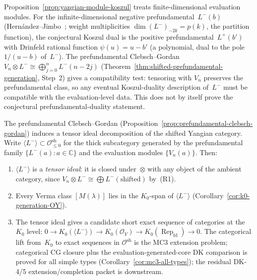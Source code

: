 \begin{remark}
\label{rem:prefundamental-koszul-extension}
Proposition~\ref{prop:yangian-module-koszul} treats finite-dimensional
evaluation modules. For the infinite-dimensional negative
prefundamental~$L^-(b)$
(Hern\'andez--Jimbo~\cite{HJZ25}; weight multiplicities
$\dim(L^-)_{-2k} = p(k)$, the partition function), the conjectural
Koszul dual is the positive prefundamental~$L^+(b')$ with Drinfeld
rational function $\psi(u) = u - b'$ (a polynomial, dual to the
pole~$1/(u - b)$ of~$L^-$). The prefundamental Clebsch--Gordan
$V_n \otimes L^- \cong \bigoplus_{j=0}^{n} L^-(n-2j)$
(Theorem~\ref{thm:shifted-prefundamental-generation},
Step~2) gives a compatibility test: tensoring with $V_n$
preserves the prefundamental class, so any eventual Koszul-duality
description of~$L^-$ must be compatible with the evaluation-level
data. This does not by itself prove the conjectural
prefundamental-duality statement.
\end{remark}

\begin{remark}%
\label{rem:tensor-ideal-structure}%
%
%
The prefundamental Clebsch--Gordan
(Proposition~\ref{prop:prefundamental-clebsch-gordan})
induces a tensor ideal decomposition of the shifted Yangian
category. Write
$\langle L^- \rangle \subset \mathcal{O}^{\mathrm{sh}}_{\leq 0}$
for the thick subcategory generated by the prefundamental family
$\{L^-(a) : a \in \mathbb{C}\}$ and the evaluation modules
$\{V_n(a)\}$. Then:
\begin{enumerate}[label=\textup{(\roman*)},nosep]
\item $\langle L^- \rangle$ is a \emph{tensor ideal}: it is closed
 under~$\otimes$ with any object of the ambient category, since
 $V_n \otimes L^- \cong \bigoplus L^-(\text{shifted})$
 by~(R1).
\item Every Verma class $[M(\lambda)]$ lies in the $K_0$-span
 of $\langle L^- \rangle$
 (Corollary~\ref{cor:k0-generation-OY}).
\item The tensor ideal gives a candidate short exact sequence of
 categories at the $K_0$ level:
 $0 \to K_0(\langle L^- \rangle)
 \to K_0(\mathcal{O}_Y)
 \to K_0(\operatorname{Rep}_{\mathrm{fd}}) \to 0$.
 The categorical lift from~$K_0$ to exact sequences in
 $\mathcal{O}^{\mathrm{sh}}$ is the MC3 extension problem;
 categorical CG closure plus the
 evaluation-generated-core DK comparison is proved for all
 simple types
 \textup{(}Corollary~\ref{cor:mc3-all-types}\textup{)}; the
 residual DK-4/5 extension/completion packet is downstream.
\end{enumerate}
\end{remark}

